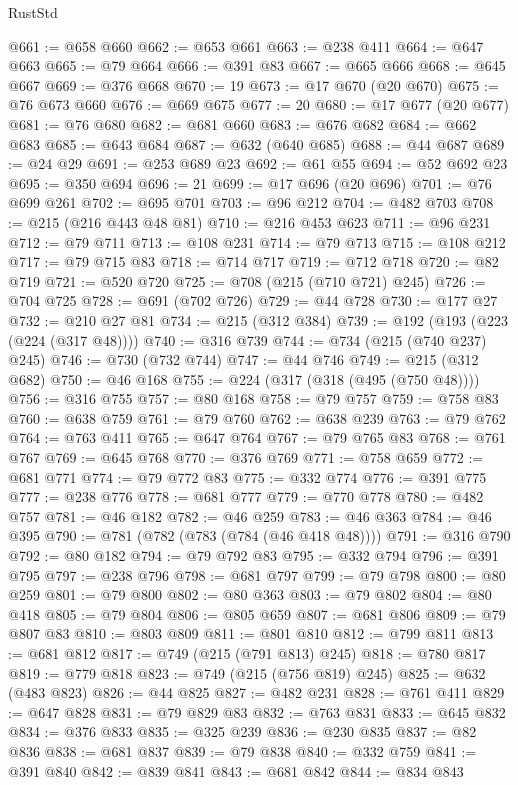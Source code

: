 \begin{lexlean}{RustStd}
\begin{coremodule}
@661 := @658 @660
@662 := @653 @661
@663 := @238 @411
@664 := @647 @663
@665 := @79 @664
@666 := @391 @83
@667 := @665 @666
@668 := @645 @667
@669 := @376 @668
@670 := 19
@673 := @17 @670 (@20 @670)
@675 := @76 @673 @660
@676 := @669 @675
@677 := 20
@680 := @17 @677 (@20 @677)
@681 := @76 @680
@682 := @681 @660
@683 := @676 @682
@684 := @662 @683
@685 := @643 @684
@687 := @632 (@640 @685)
@688 := @44 @687
@689 := @24 @29
@691 := @253 @689 @23
@692 := @61 @55
@694 := @52 @692 @23
@695 := @350 @694
@696 := 21
@699 := @17 @696 (@20 @696)
@701 := @76 @699 @261
@702 := @695 @701
@703 := @96 @212
@704 := @482 @703
@708 := @215 (@216 @443 @48 @81)
@710 := @216 @453 @623
@711 := @96 @231
@712 := @79 @711
@713 := @108 @231
@714 := @79 @713
@715 := @108 @212
@717 := @79 @715 @83
@718 := @714 @717
@719 := @712 @718
@720 := @82 @719
@721 := @520 @720
@725 := @708 (@215 (@710 @721) @245)
@726 := @704 @725
@728 := @691 (@702 @726)
@729 := @44 @728
@730 := @177 @27
@732 := @210 @27 @81
@734 := @215 (@312 @384)
@739 := @192 (@193 (@223 (@224 (@317 @48))))
@740 := @316 @739
@744 := @734 (@215 (@740 @237) @245)
@746 := @730 (@732 @744)
@747 := @44 @746
@749 := @215 (@312 @682)
@750 := @46 @168
@755 := @224 (@317 (@318 (@495 (@750 @48))))
@756 := @316 @755
@757 := @80 @168
@758 := @79 @757
@759 := @758 @83
@760 := @638 @759
@761 := @79 @760
@762 := @638 @239
@763 := @79 @762
@764 := @763 @411
@765 := @647 @764
@767 := @79 @765 @83
@768 := @761 @767
@769 := @645 @768
@770 := @376 @769
@771 := @758 @659
@772 := @681 @771
@774 := @79 @772 @83
@775 := @332 @774
@776 := @391 @775
@777 := @238 @776
@778 := @681 @777
@779 := @770 @778
@780 := @482 @757
@781 := @46 @182
@782 := @46 @259
@783 := @46 @363
@784 := @46 @395
@790 := @781 (@782 (@783 (@784 (@46 @418 @48))))
@791 := @316 @790
@792 := @80 @182
@794 := @79 @792 @83
@795 := @332 @794
@796 := @391 @795
@797 := @238 @796
@798 := @681 @797
@799 := @79 @798
@800 := @80 @259
@801 := @79 @800
@802 := @80 @363
@803 := @79 @802
@804 := @80 @418
@805 := @79 @804
@806 := @805 @659
@807 := @681 @806
@809 := @79 @807 @83
@810 := @803 @809
@811 := @801 @810
@812 := @799 @811
@813 := @681 @812
@817 := @749 (@215 (@791 @813) @245)
@818 := @780 @817
@819 := @779 @818
@823 := @749 (@215 (@756 @819) @245)
@825 := @632 (@483 @823)
@826 := @44 @825
@827 := @482 @231
@828 := @761 @411
@829 := @647 @828
@831 := @79 @829 @83
@832 := @763 @831
@833 := @645 @832
@834 := @376 @833
@835 := @325 @239
@836 := @230 @835
@837 := @82 @836
@838 := @681 @837
@839 := @79 @838
@840 := @332 @759
@841 := @391 @840
@842 := @839 @841
@843 := @681 @842
@844 := @834 @843

\end{coremodule}
\end{lexlean}
